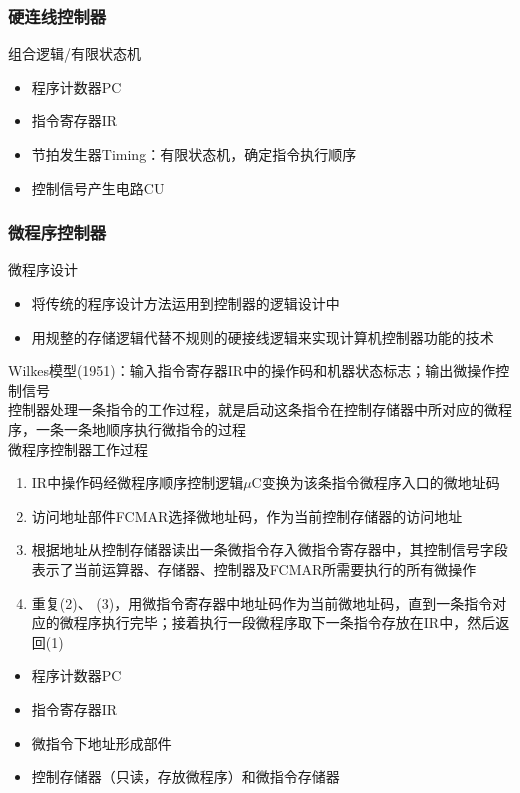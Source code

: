\subsubsection{硬连线控制器}
组合逻辑/有限状态机
\begin{itemize}
	\item 程序计数器PC
	\item 指令寄存器IR
	\item 节拍发生器Timing：有限状态机，确定指令执行顺序
	\item 控制信号产生电路CU
\end{itemize}

\subsubsection{微程序控制器}
\begin{center}
\end{center}
微程序设计
\begin{itemize}
	\item 将传统的程序设计方法运用到控制器的逻辑设计中
	\item 用规整的存储逻辑代替不规则的硬接线逻辑来实现计算机控制器功能的技术
\end{itemize}
Wilkes模型(1951)：输入指令寄存器IR中的操作码和机器状态标志；输出微操作控制信号\\
控制器处理一条指令的工作过程，就是启动这条指令在控制存储器中所对应的微程序，一条一条地顺序执行微指令的过程\\
微程序控制器工作过程
\begin{enumerate}
	\item IR中操作码经微程序顺序控制逻辑$\mu$C变换为该条指令微程序入口的微地址码
	\item 访问地址部件FCMAR选择微地址码，作为当前控制存储器的访问地址
	\item 根据地址从控制存储器读出一条微指令存入微指令寄存器中，其控制信号字段表示了当前运算器、存储器、控制器及FCMAR所需要执行的所有微操作
	\item 重复(2)、 (3)，用微指令寄存器中地址码作为当前微地址码，直到一条指令对应的微程序执行完毕；接着执行一段微程序取下一条指令存放在IR中，然后返回(1)
\end{enumerate}
\begin{itemize}
	\item 程序计数器PC
	\item 指令寄存器IR
	\item 微指令下地址形成部件
	\item 控制存储器（只读，存放微程序）和微指令存储器
\end{itemize}
